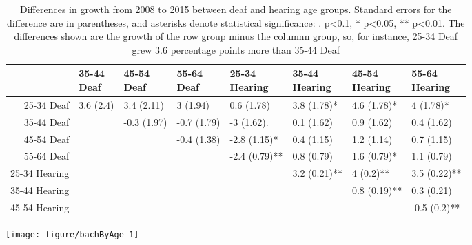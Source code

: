 \documentclass{article}\usepackage[]{graphicx}\usepackage[]{color}
\makeatletter
\def\maxwidth{ %
  \ifdim\Gin@nat@width>\linewidth
    \linewidth
  \else
    \Gin@nat@width
  \fi
}
\newenvironment{knitrout}{}{} %
\makeatother
\begin{document}
\begin{table}[ht]
\centering
\begingroup\small
\begin{tabular}{rlllllll}
  \hline
 & \thead{35-44\\Deaf} & \thead{45-54\\Deaf} & \thead{55-64\\Deaf} & \thead{25-34\\Hearing} & \thead{35-44\\Hearing} & \thead{45-54\\Hearing} & \thead{55-64\\Hearing} \\
  \hline
25-34 Deaf & 3.6 (2.4) & 3.4 (2.11) & 3 (1.94) & 0.6 (1.78) & 3.8 (1.78)* & 4.6 (1.78)* & 4 (1.78)* \\
  35-44 Deaf &  & -0.3 (1.97) & -0.7 (1.79) & -3 (1.62). & 0.1 (1.62) & 0.9 (1.62) & 0.4 (1.62) \\
  45-54 Deaf &  &  & -0.4 (1.38) & -2.8 (1.15)* & 0.4 (1.15) & 1.2 (1.14) & 0.7 (1.15) \\
  55-64 Deaf &  &  &  & -2.4 (0.79)** & 0.8 (0.79) & 1.6 (0.79)* & 1.1 (0.79) \\
  25-34 Hearing &  &  &  &  & 3.2 (0.21)** & 4 (0.2)** & 3.5 (0.22)** \\
  35-44 Hearing &  &  &  &  &  & 0.8 (0.19)** & 0.3 (0.21) \\
  45-54 Hearing &  &  &  &  &  &  & -0.5 (0.2)** \\
   \hline
\end{tabular}
\endgroup
\caption{Differences in growth from 2008 to 2015 between deaf and hearing age
groups. Standard errors for the difference are in parentheses, and asterisks denote statistical significance: . p<0.1, * p<0.05, ** p<0.01. The differences shown are the growth of the row group minus the columnn group, so, for instance, 25-34 Deaf grew 3.6 percentage points more than 35-44 Deaf}
\label{tab:hsAgeGrowth}
\end{table}



\begin{center}
\begin{knitrout}
\color{fgcolor}
\texttt{[image: figure/bachByAge-1]}

\end{knitrout}
\end{center}
\end{document}
